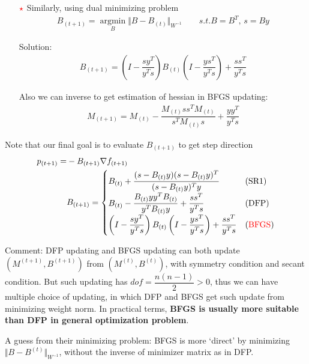\begin{itemize}[topsep=2pt,itemsep=0pt]
    \item[$ \color{red}\star $] Similarly, using dual minimizing problem
    \begin{align}
        B_{(t+1)}=\mathop{\arg\min}\limits_{B}\Vert B-B_{(t)} \Vert_{W^{-1}}\qquad s.t. B=B^T,\, s=By
    \end{align}
    
    Solution:
    \begin{align}
        B_{(t+1)}=\left(I-\dfrac{sy^T}{y^Ts}\right)B_{(t)}\left(I-\dfrac{ys^T}{y^Ts}\right)+\dfrac{ss^T}{y^Ts} \tag{BFGS}
    \end{align}

    Also we can inverse to get estimation of hessian in BFGS updating:
    \begin{align}
        M_{(t+1)}= M_{(t)}-\dfrac{ M_{(t)}ss^T M_{(t)}}{s^T M_{(t)}s}+\dfrac{yy^T}{y^Ts}
    \end{align}
    
    
\end{itemize}

    Note that our final goal is to evaluate $ B_{(t+1)} $ to get step direction
\begin{align}
    p_{(t+1)}=&-B_{(t+1)}\nabla f_{(t+1)}\\
    &B_{(t+1)}=\begin{cases}
        B_{(t)}+\dfrac{(s-B_{(t)}y)(s-B_{(t)}y)^T}{(s-B_{(t)}y)^Ty}&(\mathrm{SR1})\\
        B_{(t)}-\dfrac{B_{(t)}yy^TB_{(t)}}{y^TB_{(t)}y}+\dfrac{ss^T}{y^Ts}& (\mathrm{DFP} )\\
        \left(I-\dfrac{sy^T}{y^Ts}\right)B_{(t)}\left(I-\dfrac{ys^T}{y^Ts}\right)+\dfrac{ss^T}{y^Ts} &({\color{red}\mathrm{BFGS} })
    \end{cases}
\end{align}

    Comment: DFP updating and BFGS updating can both update $ (M^{(t+1)},B^{(t+1)}) $ from $ (M^{(t)},B^{(t)}) $, with symmetry condition and secant condition. But such updating has $ dof=\dfrac{n(n-1)}{2}>0 $, thus we can have multiple choice of updating, in which DFP and BFGS get such update from minimizing weight norm. In practical terms, \textbf{BFGS is usually more suitable than DFP in general optimization problem}. 

    A guess from their minimizing problem: BFGS is more `direct' by minimizing $ \Vert B-B^{(t)} \Vert_{W^{-1}}  $, without the inverse of minimizer matrix as in DFP.

